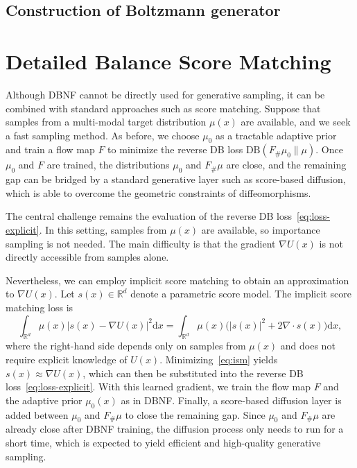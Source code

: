\documentclass{article}
\newcommand{\D}{\mathrm{d}}
\newcommand{\DB}{\mathrm{DB}}
\theoremstyle{plain}
\begin{document}
\subsection{Construction of Boltzmann generator}

\section{Detailed Balance Score Matching}

Although DBNF cannot be directly used for generative sampling, it can be combined with standard approaches such as score matching. Suppose that samples from a multi-modal target distribution $\mu(x)$ are available, and we seek a fast sampling method. As before, we choose $\mu_0$ as a tractable adaptive prior and train a flow map $F$ to minimize the reverse DB loss $\DB(F_{\#}\mu_0\|\mu)$. Once $\mu_0$ and $F$ are trained, the distributions $\mu_0$ and $F_{\#}\mu$ are close, and the remaining gap can be bridged by a standard generative layer such as score-based diffusion, which is able to overcome the geometric constraints of diffeomorphisms.

The central challenge remains the evaluation of the reverse DB loss~\eqref{eq:loss-explicit}. In this setting, samples from $\mu(x)$ are available, so importance sampling is not needed. The main difficulty is that the gradient $\nabla U(x)$ is not directly accessible from samples alone.

Nevertheless, we can employ implicit score matching to obtain an approximation to $\nabla U(x)$. Let $s(x) \in \mathbb R^d$ denote a parametric score model. The implicit score matching loss is
\begin{equation}\label{eq:ism}
    \int_{\mathbb R^d} \mu(x)  |s(x) - \nabla U(x)|^2 \D x =
    \int_{\mathbb R^d} \mu(x) \big(|s(x)|^2 + 2\nabla\cdot s(x)\big)\D x,
\end{equation}
where the right-hand side depends only on samples from $\mu(x)$ and does not require explicit knowledge of $U(x)$. Minimizing~\eqref{eq:ism} yields $s(x) \approx \nabla U(x)$, which can then be substituted into the reverse DB loss~\eqref{eq:loss-explicit}. With this learned gradient, we train the flow map $F$ and the adaptive prior $\mu_0(x)$ as in DBNF. Finally, a score-based diffusion layer is added between $\mu_0$ and $F_{\#}\mu$ to close the remaining gap. Since $\mu_0$ and $F_{\#}\mu$ are already close after DBNF training, the diffusion process only needs to run for a short time, which is expected to yield efficient and high-quality generative sampling.



\end{document}
